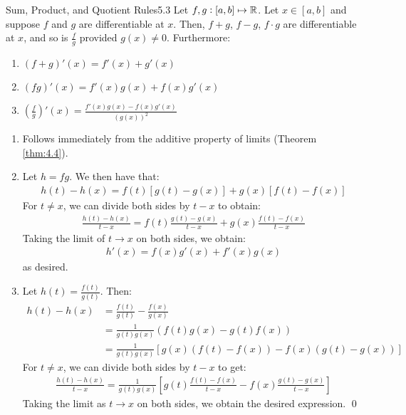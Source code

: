 \begin{theorem}{Sum, Product, and Quotient Rules}{5.3}
    Let $f, g: [a, b] \mapsto \mathbb{R}$. Let $x \in [a, b]$ and suppose $f$ and $g$ are differentiable at $x$. Then, $f + g$, $f - g$, $f\cdot g$ are differentiable at $x$, and so is $\frac{f}{g}$ provided $g(x) \neq 0$. Furthermore:
    \begin{enumerate}
        \item $(f+g)'(x) = f'(x) + g'(x)$
        \item $(fg)'(x) = f'(x)g(x) + f(x)g'(x)$
        \item $\left(\frac{f}{g}\right)'(x) = \frac{f'(x)g(x) - f(x)g'(x)}{(g(x))^2}$
    \end{enumerate}
\end{theorem}
\begin{nproof}
    \begin{enumerate}
        \item Follows immediately from the additive property of limits (Theorem \ref{thm:4.4}).
        \item Let $h = fg$. We then have that:
        \begin{align*}
            h(t) - h(x) = f(t)\left[g(t) - g(x)\right] + g(x)\left[f(t) - f(x)\right]
        \end{align*}
        For $t \neq x$, we can divide both sides by $t-x$ to obtain:
        \begin{align*}
            \frac{h(t) - h(x)}{t - x} = f(t)\frac{g(t) - g(x)}{t-x} + g(x)\frac{f(t) - f(x)}{t - x}
        \end{align*}
        Taking the limit of $t \rightarrow x$ on both sides, we obtain:
        \begin{align*}
            h'(x) = f(x)g'(x) + f'(x)g(x)
        \end{align*}
        as desired.
        \item Let $h(t) = \frac{f(t)}{g(t)}$. Then:
        \begin{align*}
            h(t) - h(x) &= \frac{f(t)}{g(t)} - \frac{f(x)}{g(x)}
            \\ &= \frac{1}{g(t)g(x)}\left(f(t)g(x) - g(t)f(x)\right)
            \\ &= \frac{1}{g(t)g(x)}\left[g(x)\left(f(t) - f(x)\right) - f(x)\left(g(t) - g(x)\right)\right]
        \end{align*}
        For $t \neq x$, we can divide both sides by $t - x$ to get:
        \begin{align*}
            \frac{h(t) - h(x)}{t - x} = \frac{1}{g(t)g(x)}\left[g(t)\frac{f(t) - f(x)}{t - x} - f(x)\frac{g(t) - g(x)}{t - x}\right]
        \end{align*}
        Taking the limit as $t \rightarrow x$ on both sides, we obtain the desired expression. \qed
    \end{enumerate}
\end{nproof}

